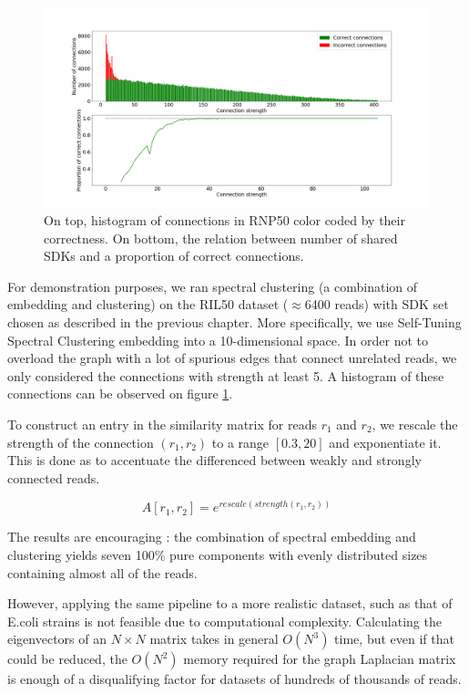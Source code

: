 \begin{figure}
\includegraphics[width=400bp]{figures/artificial_conn.png}
\caption{On top, histogram of connections in RNP50 color coded by their correctness. On bottom, the relation between number of shared SDKs and a proportion of correct connections.}
\label{fig:artificial_conn}
\end{figure}

For demonstration purposes, we ran spectral clustering (a combination of embedding and clustering) on the RIL50 dataset ($\approx$6400 reads) with SDK set chosen as described in the previous chapter. More specifically, we use Self-Tuning Spectral Clustering\cite{zelnik2005self} embedding into a 10-dimensional space. In order not to overload the graph with a lot of spurious edges that connect unrelated reads, we only considered the connections with strength at least 5. A histogram of these connections can be observed on figure \ref{fig:artificial_conn}.

To construct an entry in the similarity matrix for reads $r_1$ and $r_2$, we rescale the strength of the connection $(r_1, r_2)$ to a range $\left[ 0.3, 20\right]$ and exponentiate it. This is done as to accentuate the differenced between weakly and strongly connected reads.

$$A[r_1, r_2] = e^{rescale(strength(r_1, r_2))}$$

The results are encouraging : the combination of spectral embedding and clustering yields seven 100\% pure components with evenly distributed sizes containing almost all of the reads.

However, applying the same pipeline to a more realistic dataset, such as that of E.coli strains is not feasible due to computational complexity. Calculating the eigenvectors of an $N \times N$ matrix takes in general $O(N^3)$ time, but even if that could be reduced, the $O(N^2)$ memory required for the graph Laplacian matrix is enough of a disqualifying factor for datasets of hundreds of thousands of reads.

